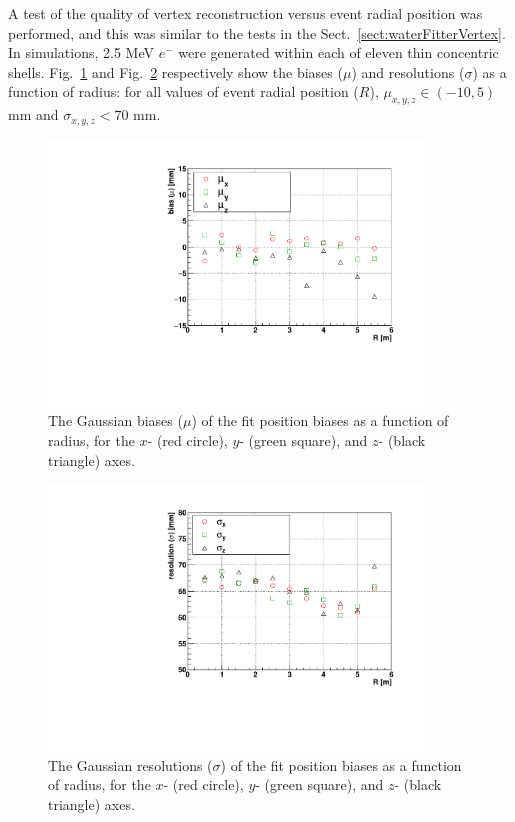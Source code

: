 A test of the quality of vertex reconstruction versus event radial position was performed, and this was similar to the tests in the Sect.~\ref{sect:waterFitterVertex}. In simulations, 2.5 MeV $e^-$ were generated within each of eleven thin concentric shells. Fig.~\ref{fig:scintShellVsBias} and Fig.~\ref{fig:scintShellVsResol} respectively show the biases ($\mu$) and resolutions ($\sigma$) as a function of radius: for all values of event radial position ($R$), $\mu_{x,y,z}\in(-10,5)$ mm and $\sigma_{x,y,z} < 70$ mm. 

\begin{figure}[!htb]
	\centering
	\includegraphics[width=10cm]{shellTestScintFitter_RvsBias.pdf}
	\caption[The Gaussian biases ($\mu$) of the \texttt{MP scint fitter} fit position biases as a function of radius, for the x, y, and z axes.]{The Gaussian biases ($\mu$) of the fit position biases as a function of radius, for the $x$- (red circle), $y$- (green square), and $z$- (black triangle) axes.}
	\label{fig:scintShellVsBias}
\end{figure}

\begin{figure}[!htb]
	\centering
	\includegraphics[width=10cm]{shellTestScintFitter_RvsResol.pdf}
	\caption[The Gaussian resolutions ($\sigma$) of the \texttt{MP scint fitter} fit position biases as a function of radius, for the $x,y,z$  axes.]{The Gaussian resolutions ($\sigma$) of the fit position biases as a function of radius, for the $x$- (red circle), $y$- (green square), and $z$- (black triangle) axes.}
	\label{fig:scintShellVsResol}
\end{figure}

